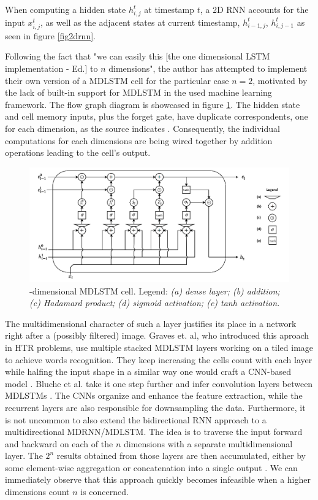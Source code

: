 When computing a hidden state $h_{i,j}^t$ at timestamp $t$, a 2D RNN accounts for the input $x_{i,j}^{t}$, as well as the adjacent states at current timestamp, $h_{i-1,j}^t$, $h_{i,j-1}^t$ \cite{mdrnn} as seen in figure \ref{fig2drnn}.

Following the fact that "we can easily this [the one dimensional LSTM implementation - Ed.] to $n$ dimensions"\cite{mdrnn}, the author has attempted to implement their own version of a MDLSTM cell for the particular case $n=2$, motivated by the lack of built-in support for MDLSTM in the used machine learning framework. The flow graph diagram is showcased in figure \ref{FigMDLSTM}. The hidden state and cell memory inputs, plus the forget gate, have duplicate correspondents, one for each dimension, as the source indicates \cite{mdrnn}. Consequently, the individual computations for each dimensions are being wired together by addition operations leading to the cell's output. 


\begin{figure}[htbp]
	\centering
		\includegraphics[scale=0.5]{figures/mdlstm_cell}
	\caption{-dimensional MDLSTM cell. \newline Legend: \textit{(a) dense layer; (b) addition; (c) Hadamard product; (d) sigmoid activation; (e) tanh activation.}}
	\label{FigMDLSTM}        
\end{figure}

The multidimensional character of such a layer justifies its place in a network right after a (possibly filtered) image. Graves et. al, who introduced this aproach in HTR problems, use multiple stacked MDLSTM layers working on a tiled image to achieve words recognition. They keep increasing the cells count with each layer while halfing the input shape in a similar way one would craft a CNN-based model \cite{GravesMDLSTM}.    Bluche  et al. take it one step further and infer convolution layers between MDLSTMs \cite{MDLSTM}. The CNNs organize and enhance the feature extraction, while the recurrent layers are also responsible for downsampling the data. Furthermore, it is not uncommon to also extend the bidirectional RNN approach to a multidirectional MDRNN/MDLSTM. The idea is to traverse the input forward and backward on each of the $n$ dimensions with a separate multidimensional layer. The $2^n$ results obtained from those layers are then accumulated, either by some element-wise aggregation or concatenation into a single output \cite{mdrnn}. We can immediately observe that this approach quickly becomes infeasible when a higher dimensions count $n$ is concerned.

